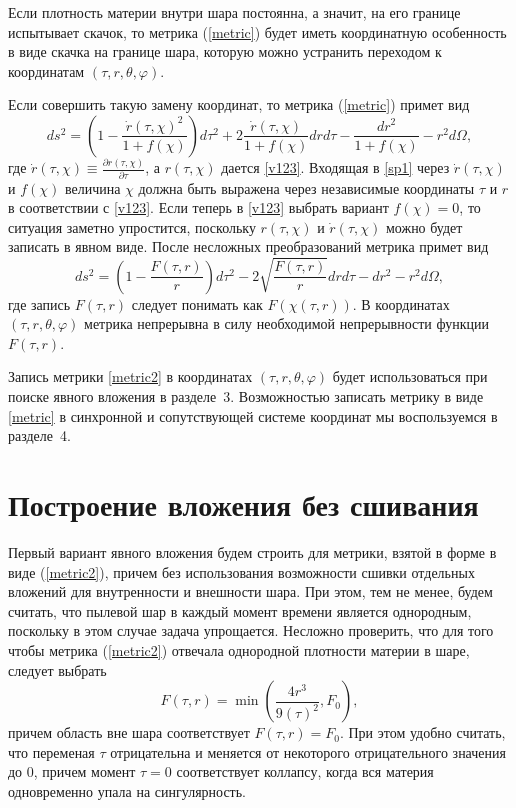 \documentclass[12pt]{article}
\newcommand{\bq}{\begin{equation}}
\newcommand{\eq}{\end{equation}}
\begin{document}
Если плотность материи внутри шара постоянна, а значит, на его границе испытывает скачок,
то метрика (\ref{metric}) будет иметь координатную особенность в виде скачка на границе шара, которую можно устранить
переходом к координатам $(\tau, r, \theta, \varphi)$.

Если совершить такую замену координат, то метрика (\ref{metric}) примет вид
\bq\label{sp1}
	d s^2 = \left( 1- \frac{\dot{r}(\tau, \chi)^2}{1+f(\chi)}\right) d \tau^2 + 2\frac{\dot{r}(\tau, \chi)}{1+f(\chi)}dr d\tau - \frac{dr^2}{1+f(\chi)} - r^2 d\Omega,
\eq
где $\dot{r}(\tau, \chi) \equiv \frac{\partial r(\tau, \chi)}{\partial \tau}$, а $r(\tau, \chi)$ дается \eqref{v123}.
Входящая в \eqref{sp1} через $\dot{r}(\tau, \chi)$ и $f(\chi)$ величина $\chi$
должна быть выражена через независимые координаты $\tau$ и $r$ в соответствии с \eqref{v123}. 
Если теперь в \eqref{v123} выбрать вариант $f(\chi)=0$, то ситуация заметно упростится, поскольку
 $r(\tau, \chi)$ и $\dot{r}(\tau, \chi)$ можно будет записать в явном виде. После несложных преобразований метрика примет вид
\bq
\label{metric2}
	d s^2 = \left(1-\frac{F(\tau, r)}{r} \right)d\tau^2 - 2 \sqrt{\frac{F(\tau, r)}{r}}dr d\tau  - dr^2 - r^2 d\Omega,
\eq
где запись $F(\tau, r)$ следует понимать как $F(\chi(\tau, r))$.
В координатах $(\tau, r, \theta, \varphi)$ метрика непрерывна в силу необходимой непрерывности функции $F(\tau, r)$.

Запись метрики \eqref{metric2} в координатах $(\tau, r, \theta, \varphi)$ будет использоваться при поиске явного вложения в разделе~3.
Возможностью записать метрику в виде \eqref{metric} в синхронной и сопутствующей системе координат мы воспользуемся в разделе~4.



\section{Построение вложения без сшивания}
Первый вариант явного вложения будем строить для метрики, взятой в форме в виде (\ref{metric2}),
причем без использования возможности сшивки отдельных вложений для внутренности и внешности шара.
При этом, тем не менее, будем считать, что пылевой шар в каждый момент времени является однородным, поскольку
в этом случае задача упрощается.
Несложно проверить, что для того чтобы метрика (\ref{metric2}) отвечала однородной плотности материи в шаре, следует выбрать
\bq\label{sp2}
	F(\tau, r) = \min{ \left( \frac{4r^3}{9(\tau)^2}, F_0 \right) },
\eq
причем область вне шара соответствует $F(\tau, r)=F_0$. При этом удобно считать, что переменая $\tau$ отрицательна и меняется от некоторого отрицательного значения до $0$, причем момент $\tau = 0$ соответствует коллапсу, когда вся материя одновременно упала на сингулярность.
\end{document}
